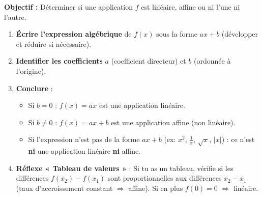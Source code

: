 \documentclass[11pt]{article}
\newcommand{\cle}[1]{{\popxbold\color{popdark}#1}}
\begin{document}
\begin{methode}
    \textbf{Objectif :} Déterminer si une application $f$ est linéaire, affine ou ni l'une ni l'autre.
    \begin{enumerate}
        \item \textbf{Écrire l'expression algébrique} de $f(x)$ sous la forme $ax+b$ (développer et réduire si nécessaire).
        \item \textbf{Identifier les coefficients} $a$ (coefficient directeur) et $b$ (ordonnée à l'origine).
        \item \textbf{Conclure} :
        \begin{itemize}
            \item Si $b = 0$ : $f(x) = ax$ est une \cle{application linéaire}.
            \item Si $b \neq 0$ : $f(x) = ax+b$ est une \cle{application affine} (non linéaire).
            \item Si l'expression n'est pas de la forme $ax+b$ (ex: $x^2$, $\frac{1}{x}$, $\sqrt{x}$, $|x|$) : ce n'est \textbf{ni} une application linéaire \textbf{ni} affine.
        \end{itemize}
        \item \textbf{Réflexe « Tableau de valeurs »} : Si tu as un tableau, vérifie si les différences $f(x_2)-f(x_1)$ sont proportionnelles aux différences $x_2-x_1$ (taux d'accroissement constant $\Rightarrow$ affine). Si en plus $f(0)=0$ $\Rightarrow$ linéaire.
    \end{enumerate}
\end{methode}
\end{document}
